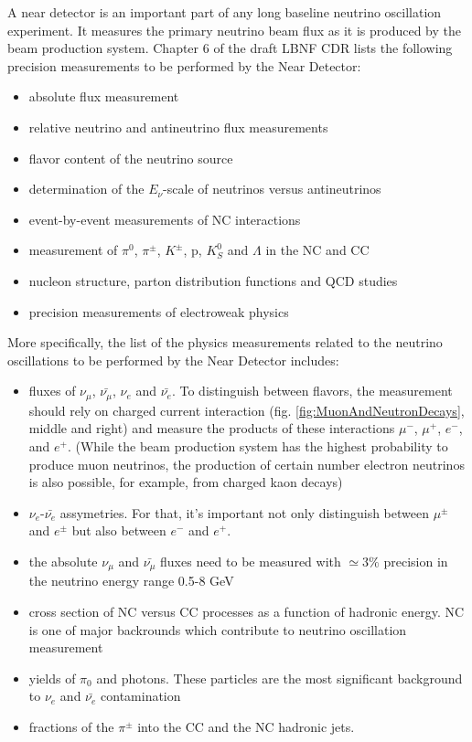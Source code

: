 A near detector is an important part of any long baseline neutrino oscillation experiment. It measures the primary neutrino beam flux as it is produced by the beam production system. Chapter 6 of the draft LBNF CDR \cite{ref_LBNFdoc_volume-detectors} lists the following precision measurements to be performed by the Near Detector: 
\begin{itemize}
  \item absolute flux measurement
  \item relative neutrino and antineutrino flux measurements
  \item flavor content of the neutrino source
  \item determination of the $E_\nu$-scale of neutrinos versus antineutrinos
  \item event-by-event measurements of NC interactions
  \item measurement of $\pi^0$, $\pi^\pm$, $K^\pm$, p, $K^0_S$ and $\Lambda$ in the NC and CC
  \item nucleon structure, parton distribution functions and QCD studies
  \item precision measurements of electroweak physics
\end{itemize}

More specifically, the list of the physics measurements related to the neutrino oscillations to be performed by the Near Detector includes:
\begin{itemize}
  \item fluxes of $\nu_\mu$, $\bar{\nu_\mu}$, $\nu_e$ and $\bar{\nu_e}$. To distinguish between flavors, the measurement should rely on charged current interaction (fig. \ref{fig:MuonAndNeutronDecays}, middle and right) and measure the products of these interactions $\mu^-$, $\mu^+$, $e^-$, and $e^+$. (While the beam production system has the highest probability to produce muon neutrinos, the production of certain number electron neutrinos is also possible, for example, from charged kaon decays)
  \item $\nu_e$-$\bar{\nu_e}$ assymetries. For that, it's important not only distinguish between $\mu^\pm$ and $e^\pm$ but also between $e^-$ and $e^+$.
  \item the absolute $\nu_\mu$ and $\bar{\nu_\mu}$ fluxes need to be measured with $\simeq{3\%}$ precision in the neutrino energy range 0.5-8 GeV
  \item cross section of NC versus CC processes as a function of hadronic energy. NC is one of major backrounds which contribute to neutrino oscillation measurement
  \item yields of $\pi_0$ and photons. These particles are the most significant background to $\nu_e$ and $\bar{\nu_e}$ contamination
  \item fractions of the $\pi^\pm$ into the CC and the NC hadronic jets.    
\end{itemize} 


